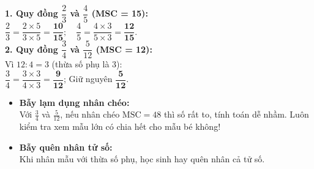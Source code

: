\documentclass[14pt,a4paper,oneside]{extbook}
\begin{document}
\vspace{-2.5mm}
\noindent
\begin{minipage}[t]{0.49\textwidth}\vspace{0pt}
\begin{tcolorbox}[
  enhanced,
  colback=green!4!white,
  colframe=green!60!black,
  arc=2mm, boxrule=0.8pt,
  left=2mm, right=2mm, top=1.8mm, bottom=1.8mm,
  title={\footnotesize\bfseries\color{white}\faCheckCircle\ Ví dụ thực hành chuẩn mực}
]
{\footnotesize
\textbf{1. Quy đồng $\dfrac{2}{3}$ và $\dfrac{4}{5}$ (MSC = 15):}\\
$\dfrac{2}{3} = \dfrac{2 \times 5}{3 \times 5} = \mathbf{\dfrac{10}{15}}; \quad \dfrac{4}{5} = \dfrac{4 \times 3}{5 \times 3} = \mathbf{\dfrac{12}{15}}$.\\
\textbf{2. Quy đồng $\dfrac{3}{4}$ và $\dfrac{5}{12}$ (MSC = 12):}\\
Vì $12 : 4 = 3$ (thừa số phụ là 3):\\
$\dfrac{3}{4} = \dfrac{3 \times 3}{4 \times 3} = \mathbf{\dfrac{9}{12}}$; \quad Giữ nguyên $\mathbf{\dfrac{5}{12}}$.
}
\end{tcolorbox}
\end{minipage}
\hfill
\begin{minipage}[t]{0.49\textwidth}\vspace{0pt}
\begin{tcolorbox}[
  enhanced,
  colback=red!4!white,
  colframe=red!70!black,
  arc=2mm, boxrule=0.8pt,
  left=2mm, right=2mm, top=1.8mm, bottom=1.8mm,
  title={\footnotesize\bfseries\color{white}\faExclamationTriangle\ Mẹo tránh bẫy trắc nghiệm}
]
{\footnotesize
\begin{itemize}\setlength{\itemsep}{1.5pt}\setlength{\leftskip}{-2.5mm}
  \item \textbf{Bẫy lạm dụng nhân chéo:}\\
  Với $\frac{3}{4}$ và $\frac{5}{12}$, nếu nhân chéo $\text{MSC} = 48$ thì số rất to, tính toán dễ nhầm. Luôn kiểm tra xem mẫu lớn có chia hết cho mẫu bé không!
  \item \textbf{Bẫy quên nhân tử số:}\\
  Khi nhân mẫu với thừa số phụ, học sinh hay quên nhân cả tử số.
\end{itemize}
}
\end{tcolorbox}
\end{minipage}
\end{document}
